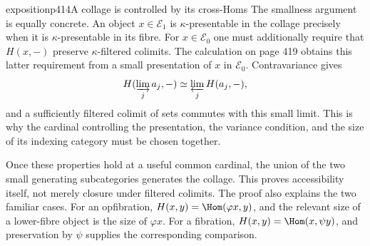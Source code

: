 \begin{dcomment}{exposition}{p414}{A collage is controlled by its cross-Homs}
The smallness argument is equally concrete. An object $x\in\mathcal E_1$ is $\kappa$-presentable in the collage precisely when it is $\kappa$-presentable in its fibre. For $x\in\mathcal E_0$ one must additionally require that $H(x,-)$ preserve $\kappa$-filtered colimits. The calculation on page 419 obtains this latter requirement from a small presentation of $x$ in $\mathcal E_0$. Contravariance gives
\[
 H(\varinjlim_j a_j,-)\simeq\varprojlim_jH(a_j,-),
\]
and a sufficiently filtered colimit of sets commutes with this small limit. This is why the cardinal controlling the presentation, the variance condition, and the size of its indexing category must be chosen together.

Once these properties hold at a useful common cardinal, the union of the two small generating subcategories generates the collage. This proves accessibility itself, not merely closure under filtered colimits. The proof also explains the two familiar cases. For an opfibration, $H(x,y)=\Hom(\varphi x,y)$, and the relevant size of a lower-fibre object is the size of $\varphi x$. For a fibration, $H(x,y)=\Hom(x,\psi y)$, and preservation by $\psi$ supplies the corresponding comparison.
\end{dcomment}

